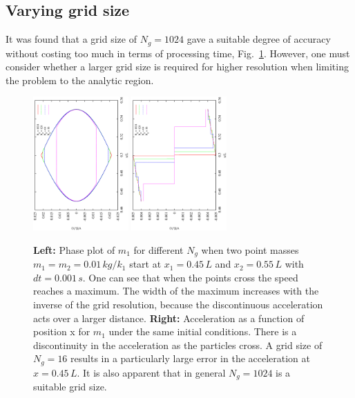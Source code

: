 \documentclass[10pt,a4paper]{article}
\begin{document}
\subsection{Varying grid size}
It was found that a grid size of $N_g = 1024$ gave a suitable degree of accuracy without costing too much in terms of processing time, Fig.~\ref{fig:phase}. However, one must consider whether a larger grid size is required for higher resolution when limiting the problem to the analytic region. 
\begin{figure}[h!]
\begin{center}
\includegraphics[width =0.325\textwidth, angle =-90]{phase.eps}
\includegraphics[width =0.325\textwidth, angle =-90]{accPhase.eps}
\caption{\textbf{Left: } Phase plot of $m_1$ for different $N_g$ when two point masses $m_1 = m_2 = 0.01\, kg/k_1$ start at $x_1 = 0.45 \,L$ and $x_2 = 0.55\,L$ with $dt=0.001\,s$. One can see that when the points cross the speed reaches a maximum. The width of the maximum increases with the inverse of the grid resolution, because the discontinuous acceleration acts over a larger distance. \textbf{Right: } Acceleration as a function of position x for $m_1$ under the same initial conditions. There is a discontinuity in the acceleration as the particles cross. A grid size of $N_g = 16$ results in a particularly large error in the acceleration at $x = 0.45\,L$. It is also apparent that in general $N_g = 1024$ is a suitable grid size.}
\label{fig:phase}
\end{center}
\end{figure}
\end{document}
